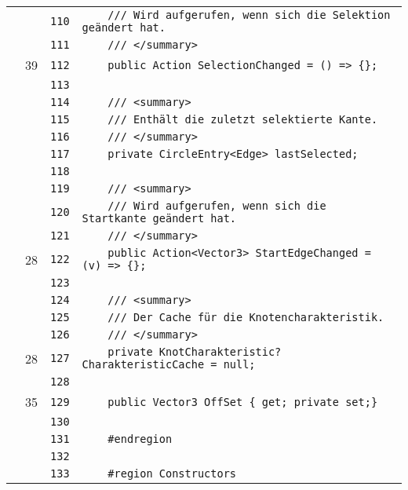 \documentclass[a4paper,10pt]{article}
\begin{document}
\begin{longtable}[l]{lrrl}
\cellcolor{gray} &  & \verb~110~ & \verb~    /// Wird aufgerufen, wenn sich die Selektion geändert hat.~\\
\cellcolor{gray} &  & \verb~111~ & \verb~    /// </summary>~\\
\cellcolor{green} & 39 & \verb~112~ & \verb~    public Action SelectionChanged = () => {};~\\
\cellcolor{gray} &  & \verb~113~ & \verb~~\\
\cellcolor{gray} &  & \verb~114~ & \verb~    /// <summary>~\\
\cellcolor{gray} &  & \verb~115~ & \verb~    /// Enthält die zuletzt selektierte Kante.~\\
\cellcolor{gray} &  & \verb~116~ & \verb~    /// </summary>~\\
\cellcolor{gray} &  & \verb~117~ & \verb~    private CircleEntry<Edge> lastSelected;~\\
\cellcolor{gray} &  & \verb~118~ & \verb~~\\
\cellcolor{gray} &  & \verb~119~ & \verb~    /// <summary>~\\
\cellcolor{gray} &  & \verb~120~ & \verb~    /// Wird aufgerufen, wenn sich die Startkante geändert hat.~\\
\cellcolor{gray} &  & \verb~121~ & \verb~    /// </summary>~\\
\cellcolor{green} & 28 & \verb~122~ & \verb~    public Action<Vector3> StartEdgeChanged = (v) => {};~\\
\cellcolor{gray} &  & \verb~123~ & \verb~~\\
\cellcolor{gray} &  & \verb~124~ & \verb~    /// <summary>~\\
\cellcolor{gray} &  & \verb~125~ & \verb~    /// Der Cache für die Knotencharakteristik.~\\
\cellcolor{gray} &  & \verb~126~ & \verb~    /// </summary>~\\
\cellcolor{green} & 28 & \verb~127~ & \verb~    private KnotCharakteristic? CharakteristicCache = null;~\\
\cellcolor{gray} &  & \verb~128~ & \verb~~\\
\cellcolor{green} & 35 & \verb~129~ & \verb~    public Vector3 OffSet { get; private set;}~\\
\cellcolor{gray} &  & \verb~130~ & \verb~~\\
\cellcolor{gray} &  & \verb~131~ & \verb~    #endregion~\\
\cellcolor{gray} &  & \verb~132~ & \verb~~\\
\cellcolor{gray} &  & \verb~133~ & \verb~    #region Constructors~\\

\end{longtable}
\end{document}
